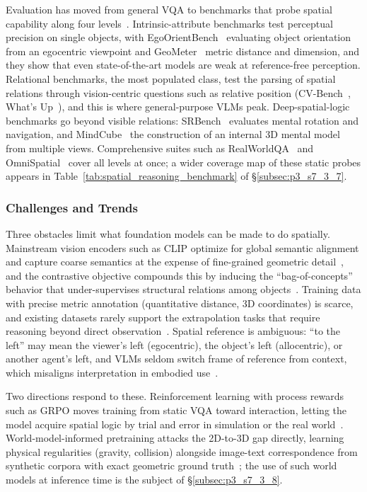 Evaluation has moved from general VQA to benchmarks that probe spatial capability along four levels~\cite{liu2025deconstructing}.
Intrinsic-attribute benchmarks test perceptual precision on single objects, with EgoOrientBench~\cite{jung2025right} evaluating object orientation from an egocentric viewpoint and GeoMeter~\cite{azad2025understanding} metric distance and dimension, and they show that even state-of-the-art models are weak at reference-free perception.
Relational benchmarks, the most populated class, test the parsing of spatial relations through vision-centric questions such as relative position (CV-Bench~\cite{tong2024cambrian}, What's Up~\cite{KamathHC23a}), and this is where general-purpose VLMs peak.
Deep-spatial-logic benchmarks go beyond visible relations: SRBench~\cite{stogiannidis2025mind} evaluates mental rotation and navigation, and MindCube~\cite{yin2025spatial} the construction of an internal 3D mental model from multiple views.
Comprehensive suites such as RealWorldQA~\cite{xai2024grok15v} and OmniSpatial~\cite{jia2025omnispatial} cover all levels at once; a wider coverage map of these static probes appears in Table~\ref{tab:spatial_reasoning_benchmark} of §\ref{subsec:p3_s7_3_7}.



\subsubsection{Challenges and Trends}
Three obstacles limit what foundation models can be made to do spatially.
Mainstream vision encoders such as CLIP optimize for global semantic alignment and capture coarse semantics at the expense of fine-grained geometric detail~\cite{wang2023makes,tong2024eyes}, and the contrastive objective compounds this by inducing the ``bag-of-concepts'' behavior that under-supervises structural relations among objects~\cite{zhou2025logic,wang2025spatialclip}.
Training data with precise metric annotation (quantitative distance, 3D coordinates) is scarce, and existing datasets rarely support the extrapolation tasks that require reasoning beyond direct observation~\cite{liu2023visual,agrawal2023stupd}.
Spatial reference is ambiguous: ``to the left'' may mean the viewer's left (egocentric), the object's left (allocentric), or another agent's left, and VLMs seldom switch frame of reference from context, which misaligns interpretation in embodied use~\cite{liu2023visual,lee2025perspective}.

Two directions respond to these.
Reinforcement learning with process rewards such as GRPO moves training from static VQA toward interaction, letting the model acquire spatial logic by trial and error in simulation or the real world~\cite{wu2025reinforcing}.
World-model-informed pretraining attacks the 2D-to-3D gap directly, learning physical regularities (gravity, collision) alongside image-text correspondence from synthetic corpora with exact geometric ground truth~\cite{yang2026mindjourney,tang2024sparkle,chen2024spatialvlm}; the use of such world models at inference time is the subject of §\ref{subsec:p3_s7_3_8}.


